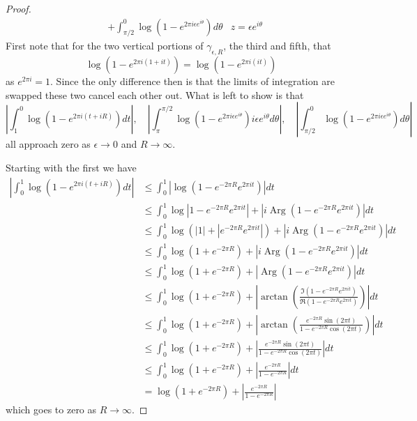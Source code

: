 \documentclass[10pt]{article}
\DeclareMathOperator{\Arg}{Arg}
\theoremstyle{remark}
\theoremstyle{remark}
\begin{document}
\begin{proof}
\begin{align*}
                                                     &+ \int_{\pi/2}^0\log\left(1-e^{2\pi i \epsilon e^{i\theta}}\right) d\theta & z=\epsilon e^{i\theta}
  \end{align*}
  First note that for the two vertical portions of $\gamma_{\epsilon,R}$, the third and fifth, that
  \[
    \log\left(1-e^{2\pi i\left(1+it\right)}\right) = \log\left(1-e^{2\pi i\left(it\right)}\right)
  \]
  as $e^{2\pi i }=1$. Since the only difference then is that the limits of integration are swapped
  these two cancel each other out. What is left to show is that
  \[
    \left|\int_1^0\log\left(1-e^{2\pi i\left(t+iR\right)}\right)dt\right|,\quad\left|\int_{\pi}^{\pi/2}\log\left(1-e^{2\pi i\epsilon e^{i\theta}}\right)i\epsilon e^{i\theta}d\theta\right|,\quad \left|\int_{\pi/2}^0\log\left(1-e^{2\pi i \epsilon e^{i\theta}}\right) d\theta\right|
  \]
  all approach zero as $\epsilon\rightarrow 0 $ and $R\rightarrow\infty$.

  Starting with the first we have
  \begin{align*}
    \left|\int_0^1\log\left(1-e^{2\pi i\left(t+iR\right)}\right)dt\right| &\leq \int_0^1\left|\log\left(1-e^{-2\pi R}e^{2\pi i t}\right)\right|dt\\
                                              &\leq\int_0^1\log\left|1-e^{-2\pi R}e^{2\pi i t}\right|+\left|i\Arg\left(1-e^{-2\pi R}e^{2\pi it}\right)\right|dt\\
                                              & \leq\int_0^1\log\left(\left|1\right|+\left|e^{-2\pi R}e^{2\pi i t}\right|\right)+\left|i\Arg\left(1-e^{-2\pi R}e^{2\pi it}\right)\right|dt\\
                                              &\leq\int_0^1\log\left(1+e^{-2\pi R}\right)+\left|i\Arg\left(1-e^{-2\pi R}e^{2\pi it}\right)\right|dt\\
                                              &\leq\int_0^1\log\left(1+e^{-2\pi R}\right)+\left|\Arg\left(1-e^{-2\pi R}e^{2\pi it}\right)\right|dt\\
                                              &\leq\int_0^1\log\left(1+e^{-2\pi R}\right)+\left|\arctan\left(\frac{\Im\left(1-e^{-2\pi R}e^{2\pi it}\right)}{\Re\left(1-e^{-2\pi R}e^{2\pi it}\right)}\right)\right|dt\\
                                              &\leq\int_0^1\log\left(1+e^{-2\pi R}\right)+\left|\arctan\left(\frac{e^{-2\pi R}\sin\left(2\pi t\right)}{1-e^{-2\pi R}\cos\left(2\pi t\right)}\right)\right|dt\\
                                              &\leq\int_0^1\log\left(1+e^{-2\pi R}\right)+\left|\frac{e^{-2\pi R}\sin\left(2\pi t\right)}{1-e^{-2\pi R}\cos\left(2\pi t\right)}\right|dt\\
                                              &\leq\int_0^1\log\left(1+e^{-2\pi R}\right)+\left|\frac{e^{-2\pi R}}{1-e^{-2\pi R}}\right|dt\\
                                              &= \log\left(1+e^{-2\pi R}\right)+\left|\frac{e^{-2\pi R}}{1-e^{-2\pi R}}\right|
  \end{align*}
  which goes to zero as $R\rightarrow \infty$.


\end{proof}
\end{document}
